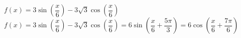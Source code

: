 {$f(x) =3 \sin \left(\dfrac{x}{6}\right) -3\sqrt{3} \cos \left(\dfrac{x}{6}\right)$\label{expandedsinusoidexerlast}}
{$f(x) =3\sin\left(\dfrac{x}{6}\right) -3\sqrt{3} \cos\left(\dfrac{x}{6}\right) = 6\sin\left( \dfrac{x}{6}+\dfrac{5\pi}{3}\right)= 6\cos\left( \dfrac{x}{6}+\dfrac{7\pi}{6}\right) $}
